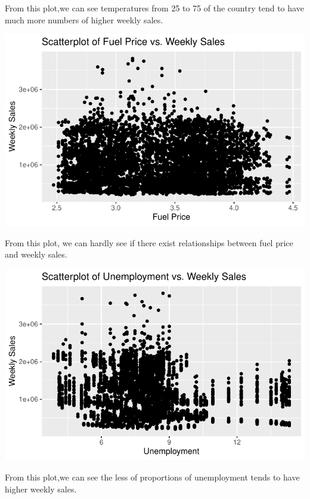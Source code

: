 \documentclass[
  letterpaper,
  DIV=11,
  numbers=noendperiod]{scrartcl}
\begin{document}
From this plot,we can see temperatures from 25 to 75 of the country tend
to have much more numbers of higher weekly sales.

\includegraphics{678final_files/figure-pdf/unnamed-chunk-15-1.pdf}

From this plot, we can hardly see if there exist relationships between
fuel price and weekly sales.

\includegraphics{678final_files/figure-pdf/unnamed-chunk-16-1.pdf}

From this plot,we can see the less of proportions of unemployment tends
to have higher weekly sales.
\end{document}
